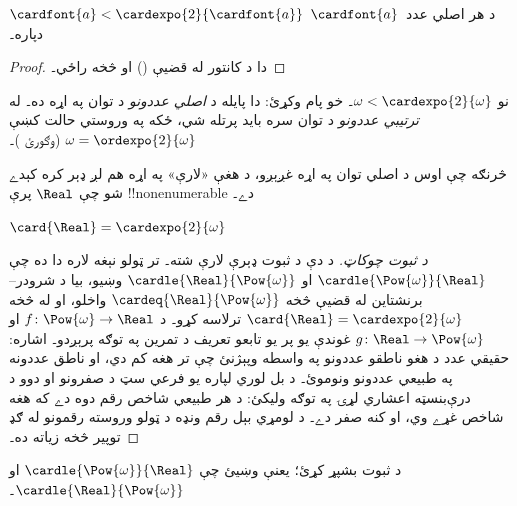 \documentclass[../../../include/open-logic-section]{subfiles}
\begin{document}
\begin{cor}
$\cardfont{a} < \cardexpo{2}{\cardfont{a}}$ د هر اصلي عدد~$\cardfont{a}$ دپاره۔
\end{cor}

\begin{proof}
دا د کانتور له قضيې () او
 څخه راځي۔
\end{proof}
\noindent
نو $\omega < \cardexpo{2}{\omega}$۔ خو پام وکړئ: دا پايله
د \emph{اصلي عددونو} د توان په اړه ده۔ له \emph{ترتيبي
عددونو} د توان سره بايد پرتله شي، ځکه په وروستي حالت کښې
$\omega = \ordexpo{2}{\omega}$ (وګورئ
)۔

څرنګه چې اوس د اصلي توان په اړه غږېږو، د هغې «لارې» په اړه هم
لږ ډېر کره کېدے شو چې $\Real$ پرې !!{nonenumerable} دے۔

\begin{thm}
$\card{\Real} = \cardexpo{2}{\omega}$
\end{thm}

\begin{proof}[د ثبوت چوکاټ]
د دې د ثبوت ډېرې لارې شته۔ تر ټولو نېغه لاره دا ده چې
$\cardle{\Pow{\omega}}{\Real}$ او
$\cardle{\Real}{\Pow{\omega}}$ وښيو، بيا د
شرودر--برنشتاين له قضيې څخه $\cardeq{\Real}{\Pow{\omega}}$
واخلو، او له 
څخه $\card{\Real} = \cardexpo{2}{\omega}$ ترلاسه کړو۔ د
$f \colon \Pow{\omega} \to \Real$ او
$g \colon \Real \to \Pow{\omega}$ غوندې يو پر يو تابعو
تعريف د تمرين په توګه پرېږدو۔ اشاره: حقيقي عدد د هغو
ناطقو عددونو په واسطه وپېژنئ چې تر هغه کم دي، او ناطق
عددونه په طبيعي عددونو ونوموئ۔ د بل لوري لپاره يو فرعي
سټ د صفرونو او دوو د درې‌بنسټه اعشاري لړۍ په توګه وليکئ:
د هر طبيعي شاخص رقم دوه دے که هغه شاخص غړے وي، او کنه
صفر دے۔ د لومړي بېل رقم ونډه د ټولو وروسته رقمونو له
ګډ توپير څخه زياته ده۔
\end{proof}

\begin{prob}
د 
ثبوت بشپړ کړئ؛ يعنې وښيئ چې $\cardle{\Pow{\omega}}{\Real}$
او $\cardle{\Real}{\Pow{\omega}}$۔
\end{prob}
\end{document}
